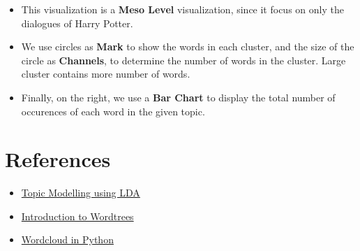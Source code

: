 \documentclass[a4paper]{article}
\begin{document}
\begin{itemize}
\begin{itemize}
    \end{itemize}
    \item This visualization is a \textbf{Meso Level} visualization, since it focus on only the dialogues of Harry Potter. 
    \item We use circles as \textbf{Mark} to show the words in each cluster, and the size of the circle as \textbf{Channels}, to determine the number of words in the cluster. Large cluster contains more number of words.   
    \item Finally, on the right, we use a \textbf{Bar Chart} to display the total number of occurences of each word in the given topic. 
\end{itemize}
\section{References}
\begin{itemize}
    \item \href{https://towardsdatascience.com/end-to-end-topic-modeling-in-python-latent-dirichlet-allocation-lda-35ce4ed6b3e0}{Topic Modelling using LDA} 
    \item \href{https://www.betterevaluation.org/en/evaluation-options/wordtree}{Introduction to Wordtrees} 
    \item \href{https://www.analyticsvidhya.com/blog/2021/05/how-to-build-word-cloud-in-python/}{Wordcloud in Python}
\end{itemize}
\end{document}
